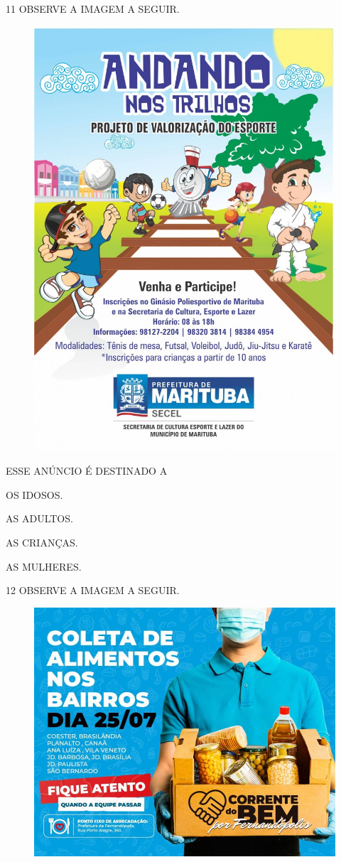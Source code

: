 \num{11} OBSERVE A IMAGEM A SEGUIR.

\begin{figure}[H]
\centering
\includegraphics[width=.6\textwidth]{./media/image235.jpg}
\end{figure}

ESSE ANÚNCIO É DESTINADO A

\begin{escolha}

\item OS IDOSOS.

\item AS ADULTOS.

\item AS CRIANÇAS.

\item AS MULHERES.

\end{escolha}

\num{12} OBSERVE A IMAGEM A SEGUIR.

\begin{figure}[H]
\centering
\includegraphics[width=.6\textwidth]{./media/image236.png}
\end{figure}

